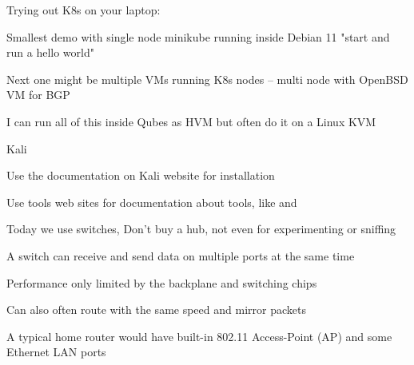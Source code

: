 \documentclass[Screen16to9,17pt]{foils}
\begin{document}
Trying out K8s on your laptop:

\begin{list2}
\item Smallest demo with single node minikube running inside Debian 11
    "start and run a hello world"
\item Next one might be multiple VMs running K8s nodes -- multi node with OpenBSD VM for BGP
\item I can run all of this inside Qubes as HVM but often do it on a Linux KVM
\end{list2}






\begin{list1}
\item Kali 
\item Use the documentation on Kali website for installation
\item Use tools web sites for documentation about tools, like  and 
\end{list1}






\begin{list1}
\item Today we use switches, Don't buy a hub, not even for experimenting or sniffing
\item A switch can receive and send data on multiple ports at the same time
\item Performance only limited by the backplane and switching chips
\item Can also often route with the same speed and mirror packets
\end{list1}




\begin{list1}
\item A typical home router would have built-in 802.11 Access-Point (AP) and some Ethernet LAN ports
\end{list1}

\end{document}
